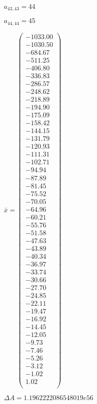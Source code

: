 \documentclass[a4paper,12pt]{article}
\begin{document}
$a _{ 43, 43 } = 44$

$a _{ 44, 44 } = 45$

$\bar { x } = \begin{pmatrix}
-1033.00 \\
-1030.50 \\
-684.67 \\
-511.25 \\
-406.80 \\
-336.83 \\
-286.57 \\
-248.62 \\
-218.89 \\
-194.90 \\
-175.09 \\
-158.42 \\
-144.15 \\
-131.79 \\
-120.93 \\
-111.31 \\
-102.71 \\
-94.94 \\
-87.89 \\
-81.45 \\
-75.52 \\
-70.05 \\
-64.96 \\
-60.21 \\
-55.76 \\
-51.58 \\
-47.63 \\
-43.89 \\
-40.34 \\
-36.97 \\
-33.74 \\
-30.66 \\
-27.70 \\
-24.85 \\
-22.11 \\
-19.47 \\
-16.92 \\
-14.45 \\
-12.05 \\
-9.73 \\
-7.46 \\
-5.26 \\
-3.12 \\
-1.02 \\
1.02 \\
\end{pmatrix}
$

$\Delta A = 1.1962222086548019e56$
\end{document}
